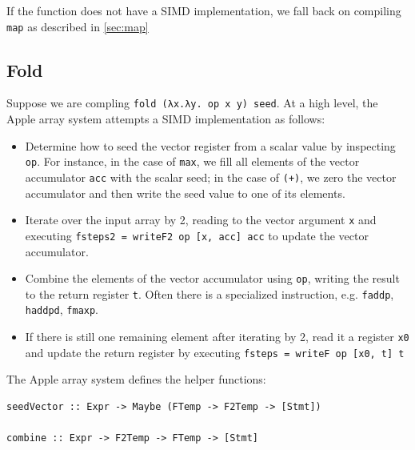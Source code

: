 \documentclass{article}
\begin{document}
If the function does not have a SIMD implementation, we fall back on compiling \verb|map| as described in \cref{sec:map}

\subsection{Fold}

Suppose we are compling \verb|fold (λx.λy. op x y) seed|. At a high level, the Apple array system attempts a SIMD implementation as follows:

\begin{itemize}
  \item Determine how to seed the vector register from a scalar value by inspecting \verb|op|. For instance, in the case of \verb|max|, we fill all elements of the vector accumulator \verb|acc| with the scalar seed; in the case of \verb|(+)|, we zero the vector accumulator and then write the seed value to one of its elements.
  \item Iterate over the input array by 2, reading to the vector argument \verb|x| and executing \verb|fsteps2 = writeF2 op [x, acc] acc| to update the vector accumulator.
  \item Combine the elements of the vector accumulator using \verb|op|, writing the result to the return register \verb|t|. Often there is a specialized instruction, e.g. \verb|faddp|, \verb|haddpd|, \verb|fmaxp|.
  \item If there is still one remaining element after iterating by 2, read it a register \verb|x0| and update the return register by executing \verb|fsteps = writeF op [x0, t] t|
\end{itemize}

The Apple array system defines the helper functions:

\begin{verbatim}
seedVector :: Expr -> Maybe (FTemp -> F2Temp -> [Stmt])

combine :: Expr -> F2Temp -> FTemp -> [Stmt]
\end{verbatim}
\end{document}
